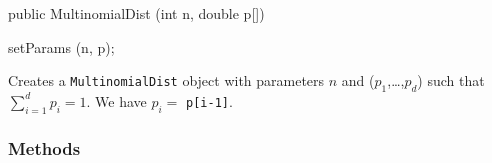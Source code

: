 \begin{code}

   public MultinomialDist (int n, double p[]) \begin{hide} {
      setParams (n, p);
   }\end{hide}
\end{code}
\begin{tabb}
   Creates a \texttt{MultinomialDist} object with parameters $n$ and
   ($p_1$,\ldots,$p_d$) such that $\sum_{i=1}^{d} p_i = 1$. We have
   $p_i = $ \texttt{p[i-1]}.
\end{tabb}


\subsubsection* {Methods}

